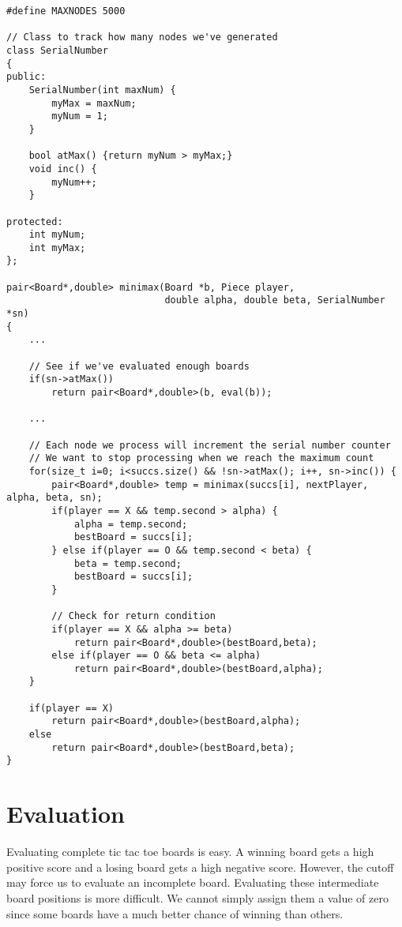 \documentclass[10pt]{article}
\begin{document}
\begin{verbatim}
#define MAXNODES 5000

// Class to track how many nodes we've generated
class SerialNumber
{
public:
    SerialNumber(int maxNum) {
        myMax = maxNum; 
        myNum = 1;
    }

    bool atMax() {return myNum > myMax;}
    void inc() {
        myNum++;
    }

protected:
    int myNum;
    int myMax;
};

pair<Board*,double> minimax(Board *b, Piece player, 
                            double alpha, double beta, SerialNumber *sn)
{
    ...

    // See if we've evaluated enough boards
    if(sn->atMax())
        return pair<Board*,double>(b, eval(b));
    
    ...

    // Each node we process will increment the serial number counter
    // We want to stop processing when we reach the maximum count
    for(size_t i=0; i<succs.size() && !sn->atMax(); i++, sn->inc()) {
        pair<Board*,double> temp = minimax(succs[i], nextPlayer, alpha, beta, sn);
        if(player == X && temp.second > alpha) {
            alpha = temp.second;
            bestBoard = succs[i];
        } else if(player == O && temp.second < beta) {
            beta = temp.second;
            bestBoard = succs[i];
        }

        // Check for return condition
        if(player == X && alpha >= beta)
            return pair<Board*,double>(bestBoard,beta);
        else if(player == O && beta <= alpha)
            return pair<Board*,double>(bestBoard,alpha);
    }

    if(player == X)
        return pair<Board*,double>(bestBoard,alpha);
    else
        return pair<Board*,double>(bestBoard,beta);
}
\end{verbatim}

\section{Evaluation}
Evaluating complete tic tac toe boards is easy.  A winning board gets a high
positive score and a losing board gets a high negative score.  However, the
cutoff may force us to evaluate an incomplete board.  Evaluating these 
intermediate board positions is more difficult.  We cannot simply assign them
a value of zero since some boards have a much better chance of winning than
others.  
\end{document}
